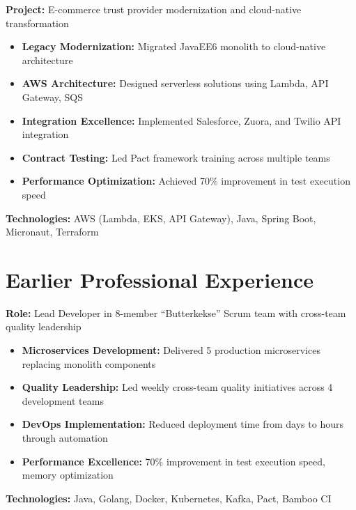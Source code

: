\documentclass[11pt,a4paper,sans]{moderncv}
\begin{document}
\vspace{5pt}

{
\textbf{Project:} E-commerce trust provider modernization and cloud-native transformation
\begin{itemize}[noitemsep,topsep=5pt]
\item \textbf{Legacy Modernization:} Migrated JavaEE6 monolith to cloud-native architecture
\item \textbf{AWS Architecture:} Designed serverless solutions using Lambda, API Gateway, SQS
\item \textbf{Integration Excellence:} Implemented Salesforce, Zuora, and Twilio API integration
\item \textbf{Contract Testing:} Led Pact framework training across multiple teams
\item \textbf{Performance Optimization:} Achieved 70\% improvement in test execution speed
\end{itemize}
\textbf{Technologies:} AWS (Lambda, EKS, API Gateway), Java, Spring Boot, Micronaut, Terraform
}

\newpage

\section{Earlier Professional Experience}

{
\textbf{Role:} Lead Developer in 8-member ``Butterkekse'' Scrum team with cross-team quality leadership
\begin{itemize}[noitemsep,topsep=5pt]
\item \textbf{Microservices Development:} Delivered 5 production microservices replacing monolith components
\item \textbf{Quality Leadership:} Led weekly cross-team quality initiatives across 4 development teams
\item \textbf{DevOps Implementation:} Reduced deployment time from days to hours through automation
\item \textbf{Performance Excellence:} 70\% improvement in test execution speed, memory optimization
\end{itemize}
\textbf{Technologies:} Java, Golang, Docker, Kubernetes, Kafka, Pact, Bamboo CI
}

\vspace{5pt}
\end{document}
